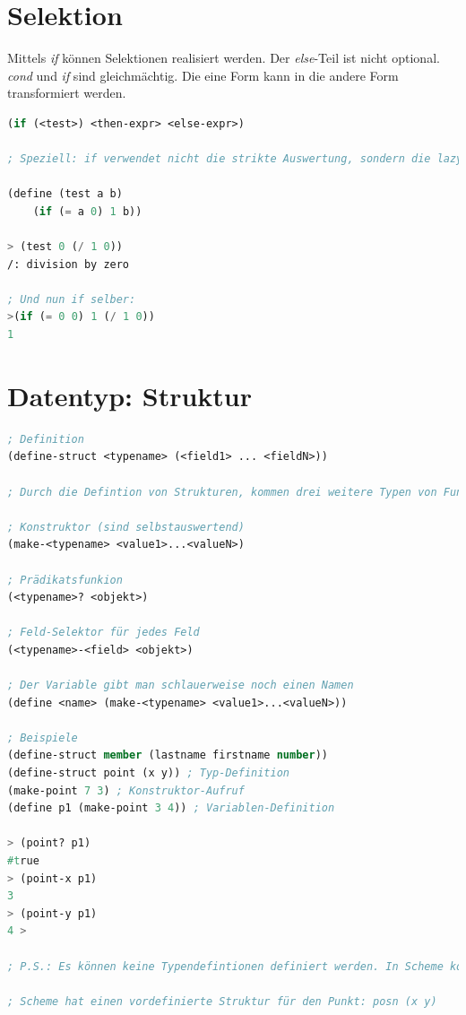 \newpage
\section{Selektion}
Mittels \emph{if} können Selektionen realisiert werden. Der \emph{else}-Teil ist nicht optional. \emph{cond} und \emph{if} sind gleichmächtig. Die eine Form kann in die andere Form transformiert werden.

\begin{lstlisting}[language=Lisp, caption=Selektion]
(if (<test>) <then-expr> <else-expr>)

; Speziell: if verwendet nicht die strikte Auswertung, sondern die lazy evaluation.

(define (test a b)
	(if (= a 0) 1 b))
	
> (test 0 (/ 1 0))
/: division by zero	

; Und nun if selber:
>(if (= 0 0) 1 (/ 1 0))
1
\end{lstlisting}

\section{Datentyp: Struktur}

\begin{lstlisting}[language=Lisp, caption=Strukturen]
; Definition
(define-struct <typename> (<field1> ... <fieldN>))

; Durch die Defintion von Strukturen, kommen drei weitere Typen von Funktionen mit

; Konstruktor (sind selbstauswertend)
(make-<typename> <value1>...<valueN>)

; Prädikatsfunkion
(<typename>? <objekt>)

; Feld-Selektor für jedes Feld
(<typename>-<field> <objekt>)

; Der Variable gibt man schlauerweise noch einen Namen
(define <name> (make-<typename> <value1>...<valueN>))

; Beispiele
(define-struct member (lastname firstname number))
(define-struct point (x y)) ; Typ-Definition
(make-point 7 3) ; Konstruktor-Aufruf
(define p1 (make-point 3 4)) ; Variablen-Definition

> (point? p1)
#true
> (point-x p1)
3
> (point-y p1)
4 >

; P.S.: Es können keine Typendefintionen definiert werden. In Scheme kommentiert man die Datentypen in den Strukturen.

; Scheme hat einen vordefinierte Struktur für den Punkt: posn (x y)
\end{lstlisting}

